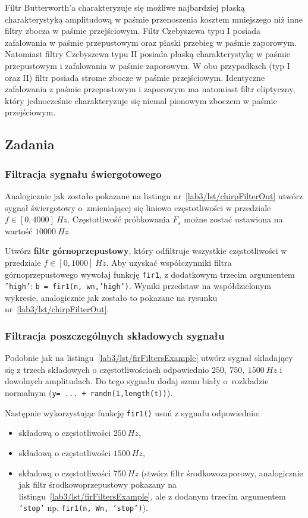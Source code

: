 Filtr Butterworth'a charakteryzuje się możliwe najbardziej płaską charakterystyką amplitudową w paśmie przenoszenia kosztem mniejszego niż inne filtry zbocza w paśmie przejściowym. Filtr Czebyszewa typu I posiada zafalowania w paśmie przepustowym oraz płaski przebieg w paśmie zaporowym. Natomiast filtry Czebyszewa typu II posiada płaską charakterystykę w paśmie przepustowym i zafalowania w paśmie zaporowym. W obu przypadkach (typ I oraz II) filtr posiada strome zbocze w paśmie przejściowym. Identyczne zafalowania z paśmie przepustowym i zaporowym ma natomiast filtr eliptyczny, który jednocześnie charakteryzuje się niemal pionowym zboczem w paśmie przejściowym.



\subsection{Zadania}
\subsubsection{Filtracja sygnału świergotowego}
Analogicznie jak zostało pokazane na listingu nr~\ref{lab3/lst/chirpFilterOut} utwórz sygnał świergotowy o~zmieniającej się liniowo częstotliwości w przedziale $f\in[0, 4000]~Hz$. Częstotliwość próbkowania $F_s$ możne zostać ustawiona na wartość $10000~Hz$.

Utwórz \textbf{filtr górnoprzepustowy}, który odfiltruje wszystkie częstotliwości w przedziale $f\in[0,1000]~Hz$. Aby uzyskać współczynniki filtra górnoprzepustowego wywołaj funkcję \texttt{fir1}, z dodatkowym trzecim argumentem \texttt{'high'}: \texttt{b = fir1(n, wn,'high')}. Wyniki przedstaw na współdzielonym wykresie, analogicznie jak zostało to pokazane na rysunku nr~\ref{lab3/lst/chirpFilterOut}.

\subsubsection{Filtracja poszczególnych składowych sygnału}
Podobnie jak na listingu~\ref{lab3/lst/firFiltersExample} utwórz sygnał składający się z trzech składowych o częstotliwościach odpowiednio $250,~750,~1500~Hz$ i dowolnych amplitudach. Do tego sygnału dodaj szum biały o~rozkładzie normalnym (\texttt{y= ... + randn(1,length(t))}). 

Następnie wykorzystując funkcję \texttt{fir1()} usuń z sygnału odpowiednio:
\begin{itemize}
	\item składową o częstotliwości $250~Hz$,
	\item składową o częstotliwości $1500~Hz$,
	\item składową o częstotliwości $750~Hz$ (stwórz filtr środkowozaporowy, analogicznie jak filtr środkowoprzepustowy pokazany na listingu~\ref{lab3/lst/firFiltersExample}, ale z dodanym trzecim argumentem \texttt{'stop'} np. \texttt{fir1(n, Wn, 'stop')}).
\end{itemize}

